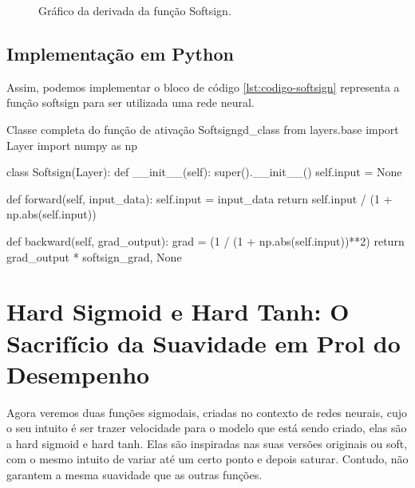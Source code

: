 \begin{figure}[h!]
    \centering
    \caption{Gráfico da derivada da função Softsign.}
    \label{fig:GraphSoftsignDerivative}
\end{figure}

\subsection{Implementação em Python}

Assim, podemos implementar o bloco de código \ref{lst:codigo-softsign} representa a função softsign para ser utilizada uma rede neural.

\begin{codelisting}{Classe completa do função de ativação Softsign}{gd_class}
from layers.base import Layer
import numpy as np

class Softsign(Layer):
    def __init__(self):
        super().__init__()
        self.input = None

    def forward(self, input_data):
        self.input = input_data
        return self.input / (1 + np.abs(self.input))

    def backward(self, grad_output):
        grad =  (1 / (1 + np.abs(self.input))**2)
        return grad_output * softsign_grad, None
\end{codelisting}

\section{Hard Sigmoid e Hard Tanh: O Sacrifício da Suavidade em Prol do Desempenho}

Agora veremos duas funções sigmodais, criadas no contexto de redes neurais, cujo o seu intuito é ser trazer velocidade para o modelo que está sendo criado, elas são a hard sigmoid e hard tanh. Elas são inspiradas nas suas versões originais ou soft, com o mesmo intuito de variar até um certo ponto e depois saturar. Contudo, não garantem a mesma suavidade que as outras funções.

